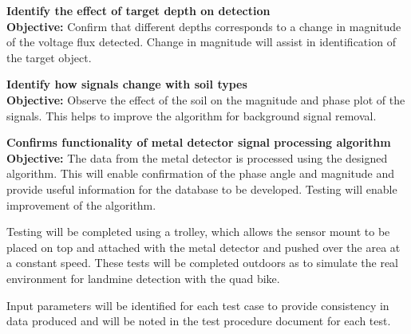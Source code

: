 \documentclass[main.tex]{subfiles}
\begin{document}
\begin{appendices}
\begin{mds}
\end{mds}

\begin{mds}
\textbf{Identify the effect of target depth on detection}\\
\textbf{Objective:} Confirm that different depths corresponds to a change in magnitude of the voltage flux detected. Change in magnitude will assist in identification of the target object. 

\end{mds}
\begin{mds}
\textbf{Identify how signals change with soil types}\\
\textbf{Objective:} Observe the effect of the soil on the magnitude and phase plot of the signals. This helps to improve the algorithm for background signal removal.  

\end{mds}
\begin{mds}
\textbf{Confirms functionality of metal detector signal processing algorithm}\\
\textbf{Objective:} The data from the metal detector is processed using the designed algorithm. This will enable confirmation of the phase angle and magnitude and provide useful information for the database to be developed. Testing will enable improvement of the algorithm. 

\end{mds}

\medskip\noindent
Testing will be completed using a trolley, which allows the sensor mount to be placed on top and attached with the metal detector and pushed over the area at a constant speed. These tests will be completed outdoors as to simulate the real environment for landmine detection with the quad bike. 

\medskip\noindent
Input parameters will be identified for each test case to provide consistency in data produced and will be noted in the test procedure document for each test. 


\end{appendices}
\end{document}
